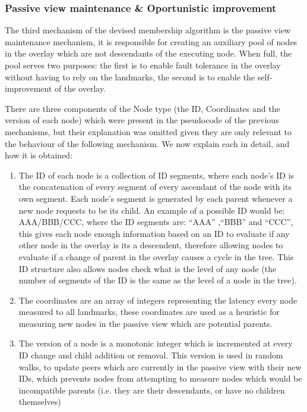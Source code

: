 \subsubsection{Passive view maintenance \& Oportunistic improvement} \label{sec:overlay_network:oportunistic_improvement}

The third mechanism of the devised membership algorithm is the passive view maintenance mechanism, it is responsible for creating an auxiliary pool of nodes in the overlay which are not descendants of the executing node. When full, the pool serves two purposes: the first is to enable fault tolerance in the overlay without having to rely on the landmarks, the second is to enable the self-improvement of the overlay. 

There are three components of the Node type (the ID, Coordinates and the version of each node) which were present in the pseudocode of the previous mechanisms, but their explanation was omitted given they are only relevant to the behaviour of the following mechanism. We now explain each in detail, and how it is obtained:

\begin{enumerate}
    \item The ID of each node is a collection of ID segments, where each node's ID is the concatenation of every segment of every ascendant of the node with its own segment. Each node's segment is generated by each parent whenever a new node requests to be its child. An example of a possible ID would be: AAA/BBB/CCC, where the ID segments are: ``AAA'' ,``BBB'' and ``CCC'', this gives each node enough information based on an ID to evaluate if any other node in the overlay is its a descendent, therefore allowing nodes to evaluate if a change of parent in the overlay causes a cycle in the tree. This ID structure also allows nodes check what is the level of any node (the number of segments of the ID is the same as the level of a node in the tree).
    
    \item The coordinates are an array of integers representing the latency every node measured to all landmarks, these coordinates are used as a heuristic for measuring new nodes in the passive view which are potential parents.
    
    \item The version of a node is a monotonic integer which is incremented at every ID change and child addition or removal. This version is used in random walks, to update peers which are currently in the passive view with their new IDs, which prevents nodes from attempting to measure nodes which would be incompatible parents (i.e. they are their descendants, or have no children themselves)
\end{enumerate}

